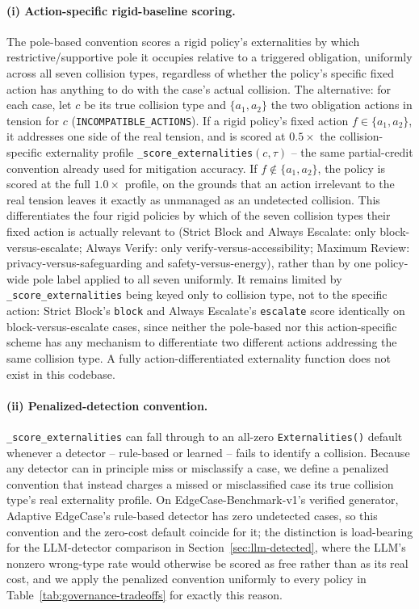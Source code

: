 \documentclass[letterpaper]{article} %
\begin{document}
\paragraph{(i) Action-specific rigid-baseline scoring.} The pole-based convention scores a rigid policy's externalities by which restrictive/supportive pole it occupies relative to a triggered obligation, uniformly across all seven collision types, regardless of whether the policy's specific fixed action has anything to do with the case's actual collision. The alternative: for each case, let $c$ be its true collision type and $\{a_1, a_2\}$ the two obligation actions in tension for $c$ (\texttt{INCOMPATIBLE\_ACTIONS}). If a rigid policy's fixed action $f \in \{a_1, a_2\}$, it addresses one side of the real tension, and is scored at $0.5\times$ the collision-specific externality profile \texttt{\_score\_externalities}$(c, \tau)$ -- the same partial-credit convention already used for mitigation accuracy. If $f \notin \{a_1, a_2\}$, the policy is scored at the full $1.0\times$ profile, on the grounds that an action irrelevant to the real tension leaves it exactly as unmanaged as an undetected collision. This differentiates the four rigid policies by which of the seven collision types their fixed action is actually relevant to (Strict Block and Always Escalate: only block-versus-escalate; Always Verify: only verify-versus-accessibility; Maximum Review: privacy-versus-safeguarding and safety-versus-energy), rather than by one policy-wide pole label applied to all seven uniformly. It remains limited by \texttt{\_score\_externalities} being keyed only to collision type, not to the specific action: Strict Block's \texttt{block} and Always Escalate's \texttt{escalate} score identically on block-versus-escalate cases, since neither the pole-based nor this action-specific scheme has any mechanism to differentiate two different actions addressing the same collision type. A fully action-differentiated externality function does not exist in this codebase.

\paragraph{(ii) Penalized-detection convention.} \texttt{\_score\_externalities} can fall through to an all-zero \texttt{Externalities()} default whenever a detector -- rule-based or learned -- fails to identify a collision. Because any detector can in principle miss or misclassify a case, we define a penalized convention that instead charges a missed or misclassified case its true collision type's real externality profile. On EdgeCase-Benchmark-v1's verified generator, Adaptive EdgeCase's rule-based detector has zero undetected cases, so this convention and the zero-cost default coincide for it; the distinction is load-bearing for the LLM-detector comparison in Section~\ref{sec:llm-detected}, where the LLM's nonzero wrong-type rate would otherwise be scored as free rather than as its real cost, and we apply the penalized convention uniformly to every policy in Table~\ref{tab:governance-tradeoffs} for exactly this reason.
\end{document}

